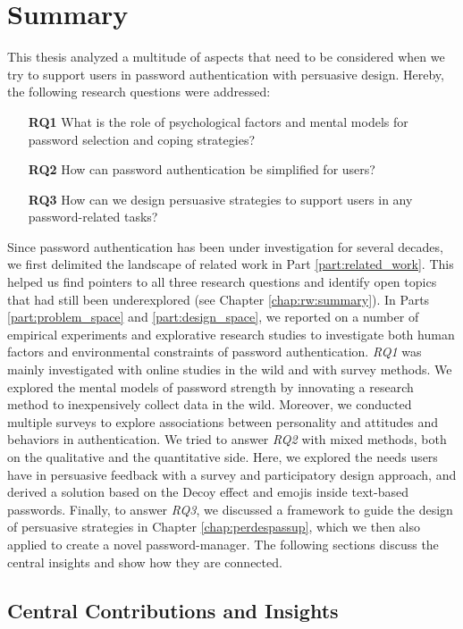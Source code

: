 \chapter[Summary]{Summary}\label{chap:summary}
This thesis analyzed a multitude of aspects that need to be considered when we try to support users in password authentication with persuasive design. Hereby, the following research questions were addressed:

\begin{itemize}
	\item[\textbf{RQ1}] What is the role of psychological factors and mental models for password selection and coping strategies?
	\item[\textbf{RQ2}] How can password authentication be simplified for users? 
	\item[\textbf{RQ3}] How can we design persuasive strategies to support users in any password-related tasks?
\end{itemize}

Since password authentication has been under investigation for several decades, we first delimited the landscape of related work in Part \ref{part:related_work}. This helped us find pointers to all three research questions and identify open topics that had still been underexplored (see Chapter \ref{chap:rw:summary}). In Parts \ref{part:problem_space} and \ref{part:design_space}, we reported on a number of empirical experiments and explorative research studies to investigate both human factors and environmental constraints of password authentication. \textit{RQ1} was mainly investigated with online studies in the wild and with survey methods. We explored the mental models of password strength by innovating a research method to inexpensively collect data in the wild. Moreover, we conducted multiple surveys to explore associations between personality and attitudes and behaviors in authentication. We tried to answer \textit{RQ2} with mixed methods, both on the qualitative and the quantitative side. Here, we explored the needs users have in persuasive feedback with a survey and participatory design approach, and derived a solution based on the Decoy effect and emojis inside text-based passwords. Finally, to answer \textit{RQ3}, we discussed a framework to guide the design of persuasive strategies in Chapter \ref{chap:perdespassup}, which we then also applied to create a novel password-manager. The following sections discuss the central insights and show how they are connected.

\section{Central Contributions and Insights}
